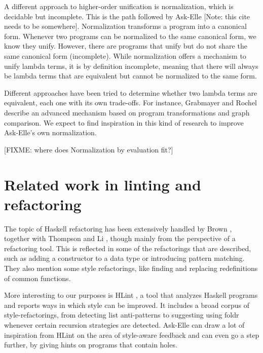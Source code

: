 A different approach to higher-order unification is normalization, which is decidable but incomplete. This is the path followed by Ask-Elle \cite{2010askelle} [Note: this cite needs to be somewhere]. Normalization transforms a program into a canonical form. Whenever two programs can be normalized to the same canonical form, we know they unify. However, there are programs that unify but do not share the same canonical form (incomplete). While normalization offers a mechanism to unify lambda terms, it is by definition incomplete, meaning that there will always be lambda terms that are equivalent but cannot be normalized to the same form.

Different approaches have been tried to determine whether two lambda terms are equivalent, each one with its own trade-offs. For instance, Grabmayer and Rochel \cite{2014letrec} describe an advanced mechanism based on program transformations and graph comparison. We expect to find inspiration in this kind of research to improve Ask-Elle's own normalization.

[FIXME: where does Normalization by evaluation fit?]

\section{Related work in linting and refactoring}

The topic of Haskell refactoring has been extensively handled by Brown \cite{2008brown}, together with Thompson and Li \cite{2013thompson}, though mainly from the perspective of a refactoring tool. This is reflected in some of the refactorings that are described, such as adding a constructor to a data type or introducing pattern matching. They also mention some style refactorings, like finding and replacing redefinitions of common functions.

More interesting to our purposes is HLint \cite{HLint}, a tool that analyzes Haskell programs and reports ways in which style can be improved. It includes a broad corpus of style-refactorings, from detecting list anti-patterns to suggesting using foldr whenever certain recursion strategies are detected. Ask-Elle can draw a lot of inspiration from HLint on the area of style-aware feedback and can even go a step further, by giving hints on programs that contain holes.
